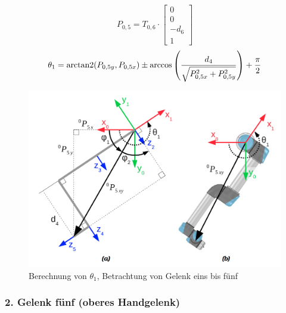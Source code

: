 \begin{equation}
    P_{0,5} = T_{0,6} \cdot
    \begin{bmatrix}
        0 \\ 0 \\ -d_6 \\ 1
    \end{bmatrix}
    \label{eq:inv1-1}
\end{equation}
\begin{equation}
    \theta_1 = \operatorname{arctan2}(P_{0,5y}, P_{0,5x}) \pm \arccos \left( \frac{d_4}{ \sqrt{ P_{0,5x}^2 + P_{0,5y}^2 }  } \right) + \frac{\pi}{2}
    \label{eq:inv1-2}
\end{equation}
\begin{figure}[h]
    \centering
    \includegraphics[width = .5\textwidth]{Bilder/inv1}
    \caption{Berechnung von $\theta_1$, Betrachtung von Gelenk eins bis fünf~\cite{rasmusandersenKinematicsUR52018}}\label{fig:inv1-1}
\end{figure}

\subsubsection{2. Gelenk fünf (oberes Handgelenk)}

